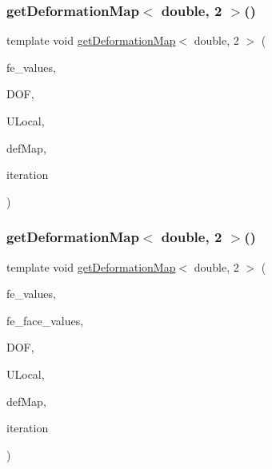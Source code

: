 \mbox{\label{function_evaluations_8cc_a934f34bca13586e71d79d67e2d405170}} 
\subsubsection{\texorpdfstring{getDeformationMap$<$ double, 2 $>$()}{getDeformationMap< double, 2 >()}\hspace{0.1cm}{\footnotesize\ttfamily [1/2]}}
{\footnotesize\ttfamily template void \mbox{\hyperlink{group___evaluation_functions_ga239b206235603af9482484c29c8d57ea}{get\+Deformation\+Map}}$<$ double, 2 $>$ (\begin{DoxyParamCaption}\item[{const F\+E\+Values$<$ 2 $>$ \&}]{fe\+\_\+values,  }\item[{unsigned int}]{D\+OF,  }\item[{Table$<$ 1, double $>$ \&}]{U\+Local,  }\item[{\mbox{\hyperlink{structdeformation_map}{deformation\+Map}}$<$ double, 2 $>$ \&}]{def\+Map,  }\item[{unsigned int}]{iteration }\end{DoxyParamCaption})}

\mbox{\label{function_evaluations_8cc_ad204a932cf153014c52e1c59196fab28}} 
\subsubsection{\texorpdfstring{getDeformationMap$<$ double, 2 $>$()}{getDeformationMap< double, 2 >()}\hspace{0.1cm}{\footnotesize\ttfamily [2/2]}}
{\footnotesize\ttfamily template void \mbox{\hyperlink{group___evaluation_functions_ga239b206235603af9482484c29c8d57ea}{get\+Deformation\+Map}}$<$ double, 2 $>$ (\begin{DoxyParamCaption}\item[{const F\+E\+Values$<$ 2 $>$ \&}]{fe\+\_\+values,  }\item[{const F\+E\+Face\+Values$<$ 2 $>$ \&}]{fe\+\_\+face\+\_\+values,  }\item[{unsigned int}]{D\+OF,  }\item[{Table$<$ 1, double $>$ \&}]{U\+Local,  }\item[{\mbox{\hyperlink{structdeformation_map}{deformation\+Map}}$<$ double, 2 $>$ \&}]{def\+Map,  }\item[{unsigned int}]{iteration }\end{DoxyParamCaption})}

